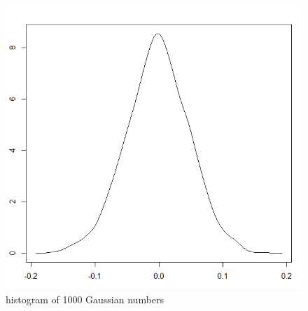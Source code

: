 \documentclass{article}
\begin{document}
\begin{figure}
    \includegraphics[width=\linewidth]{images/gaussian-2.png}
    \caption{histogram of 1000 Gaussian numbers}
    \label{fig:gaussian-2}
\end{figure}
\end{document}
